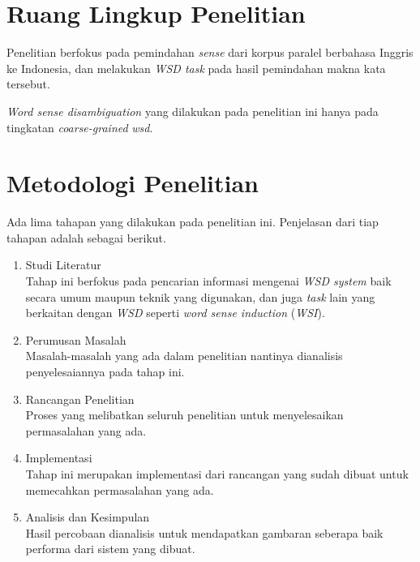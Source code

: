 \section{Ruang Lingkup Penelitian}
Penelitian berfokus pada pemindahan \textit{sense} dari korpus paralel berbahasa Inggris ke Indonesia, dan melakukan \textit{WSD task} pada hasil pemindahan makna kata tersebut.

\textit{Word sense disambiguation} yang dilakukan pada penelitian ini hanya pada tingkatan \textit{coarse-grained} \textit{wsd}.

\section{Metodologi Penelitian}
Ada lima tahapan yang dilakukan pada penelitian ini. Penjelasan dari tiap tahapan adalah sebagai berikut.
\begin{enumerate}
	\item Studi Literatur \\
	Tahap ini berfokus pada pencarian informasi mengenai \textit{WSD system} baik secara umum maupun teknik yang digunakan, dan juga \textit{task} lain yang berkaitan dengan \textit{WSD} seperti \textit{word sense induction} (\textit{WSI}).
	\item Perumusan Masalah \\
	Masalah-masalah yang ada dalam penelitian nantinya dianalisis penyelesaiannya pada tahap ini.
	\item Rancangan Penelitian\\
	Proses yang melibatkan seluruh penelitian untuk menyelesaikan permasalahan yang ada.
	\item Implementasi\\
	Tahap ini merupakan implementasi dari rancangan yang sudah dibuat untuk memecahkan permasalahan yang ada.
	\item Analisis dan Kesimpulan \\
	Hasil percobaan dianalisis untuk mendapatkan gambaran seberapa baik performa dari sistem yang dibuat.
\end{enumerate}


